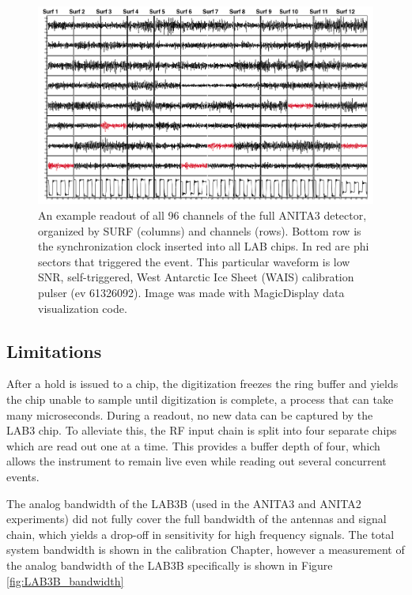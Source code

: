 		
\begin{figure}
\centering
	\includegraphics[width=\textwidth]{figures/waveformSnapshot}
	\caption{An example readout of all 96 channels of the full ANITA3 detector, organized by SURF (columns) and channels (rows).  Bottom row is the synchronization clock inserted into all LAB chips.  In red are phi sectors that triggered the event.  This particular waveform is low SNR, self-triggered, West Antarctic Ice Sheet (WAIS) calibration pulser (ev 61326092).  Image was made with MagicDisplay data visualization code.}
	\label{fig:waveformSnapshot}
\end{figure}
		
	
	
	\subsection{Limitations}
	After a hold is issued to a chip, the digitization freezes the ring buffer and yields the chip unable to sample until digitization is complete, a process that can take  many microseconds.  During a readout, no new data can be captured by the LAB3 chip.  To alleviate this, the RF input chain is split into four separate chips which are read out one at a time.  This provides a buffer depth of four, which allows the instrument to remain live even while reading out several concurrent events.
	
	The analog bandwidth of the LAB3B (used in the ANITA3 and ANITA2 experiments) did not fully cover the full bandwidth of the antennas and signal chain, which yields a drop-off in sensitivity for high frequency signals.  The total system bandwidth is shown in the calibration Chapter, however a measurement of the analog bandwidth of the LAB3B specifically is shown in Figure \ref{fig:LAB3B_bandwidth}
	
